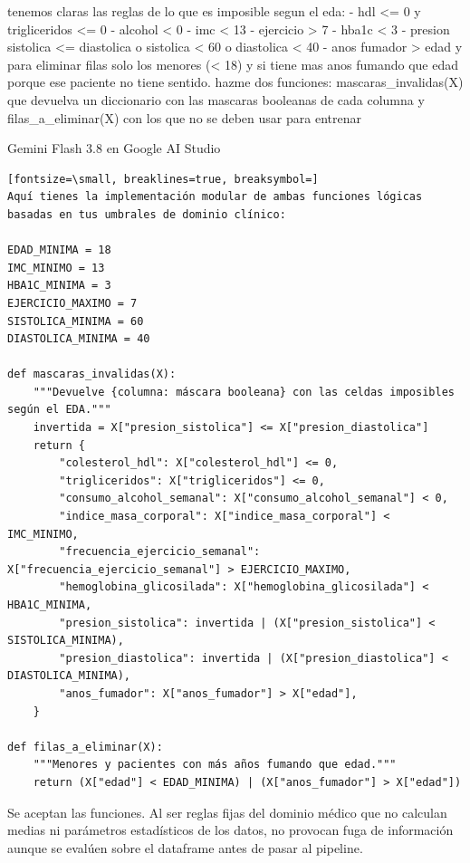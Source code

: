 \documentclass[12pt,a4paper,oneside]{book}
\begin{document}
\begin{iaprompt}
tenemos claras las reglas de lo que es imposible segun el eda: - hdl <= 0 y trigliceridos <= 0 - alcohol < 0 - imc < 13 - ejercicio > 7 - hba1c < 3 - presion sistolica <= diastolica o sistolica < 60 o diastolica < 40 - anos fumador > edad y para eliminar filas solo los menores (< 18) y si tiene mas anos fumando que edad porque ese paciente no tiene sentido. hazme dos funciones: mascaras_invalidas(X) que devuelva un diccionario con las mascaras booleanas de cada columna y filas_a_eliminar(X) con los que no se deben usar para entrenar
\end{iaprompt}
\begin{iaresp}{Gemini Flash 3.8 en Google AI Studio}
\begin{Verbatim}[fontsize=\small, breaklines=true, breaksymbol=]
Aquí tienes la implementación modular de ambas funciones lógicas basadas en tus umbrales de dominio clínico:

EDAD_MINIMA = 18
IMC_MINIMO = 13
HBA1C_MINIMA = 3
EJERCICIO_MAXIMO = 7
SISTOLICA_MINIMA = 60
DIASTOLICA_MINIMA = 40

def mascaras_invalidas(X):
    """Devuelve {columna: máscara booleana} con las celdas imposibles según el EDA."""
    invertida = X["presion_sistolica"] <= X["presion_diastolica"]
    return {
        "colesterol_hdl": X["colesterol_hdl"] <= 0,
        "trigliceridos": X["trigliceridos"] <= 0,
        "consumo_alcohol_semanal": X["consumo_alcohol_semanal"] < 0,
        "indice_masa_corporal": X["indice_masa_corporal"] < IMC_MINIMO,
        "frecuencia_ejercicio_semanal": X["frecuencia_ejercicio_semanal"] > EJERCICIO_MAXIMO,
        "hemoglobina_glicosilada": X["hemoglobina_glicosilada"] < HBA1C_MINIMA,
        "presion_sistolica": invertida | (X["presion_sistolica"] < SISTOLICA_MINIMA),
        "presion_diastolica": invertida | (X["presion_diastolica"] < DIASTOLICA_MINIMA),
        "anos_fumador": X["anos_fumador"] > X["edad"],
    }

def filas_a_eliminar(X):
    """Menores y pacientes con más años fumando que edad."""
    return (X["edad"] < EDAD_MINIMA) | (X["anos_fumador"] > X["edad"])
\end{Verbatim}
\end{iaresp}
\begin{iaanalisis}
Se aceptan las funciones. Al ser reglas fijas del dominio médico que no calculan medias ni parámetros estadísticos de los datos, no provocan fuga de información aunque se evalúen sobre el dataframe antes de pasar al pipeline.
\end{iaanalisis}
\end{document}
